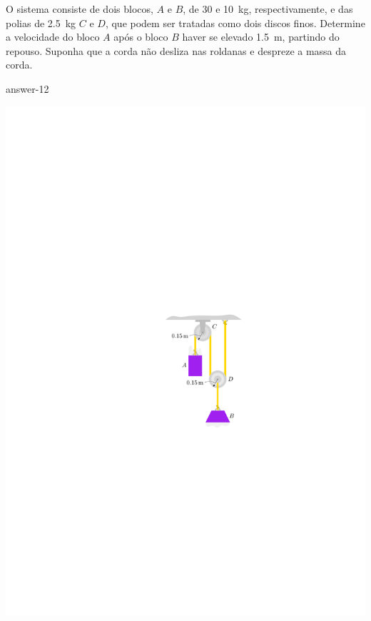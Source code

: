 \begin{minipage}{.6\linewidth}
	\vspace{-3.5cm}
	\item O sistema consiste de dois blocos, $A$ e $B$, de 30 e \SI{10}{\kilogram}, respectivamente, e das polias de \SI{2.5}{\kilogram} $C$ e $D$, que podem ser tratadas como dois discos finos. Determine a velocidade do bloco $A$ após o bloco $B$
	haver se elevado \SI{1.5}{\meter}, partindo do repouso. Suponha que a corda não desliza nas roldanas e despreze
	a massa da corda.
	
	{answer-12}
\end{minipage}
\begin{minipage}{.4\linewidth}
	\begin{flushright}
		\includegraphics[scale=1.2]{../../images/draw_5}
	\end{flushright}
\end{minipage}
